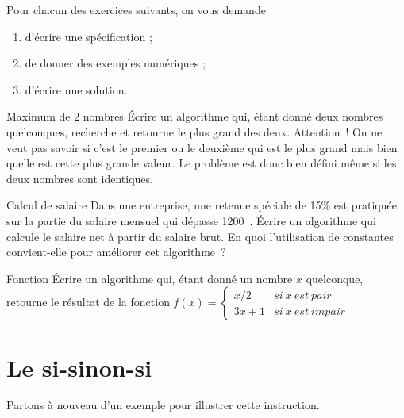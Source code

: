 		Pour chacun des exercices suivants,
		on vous demande
		\begin{enumerate}
		\item
			d'écrire une spécification ;
		\item
			de donner des exemples numériques ;
		\item
			d'écrire une solution.
		\end{enumerate}
		
		\begin{Exercice}{Maximum de 2 nombres}
			Écrire un algorithme qui, étant donné deux nombres quelconques,
			recherche et retourne le plus grand des deux. Attention~! On ne veut
			pas savoir si c’est le premier ou le deuxième qui est
			le plus grand mais bien quelle est cette plus grande valeur. Le
			problème est donc bien défini même si les deux nombres sont
			identiques.
		\end{Exercice}
		
		\begin{Exercice}{Calcul de salaire}
			Dans une entreprise, 
			une retenue spéciale de 15\% est pratiquée 
			sur la partie du salaire mensuel qui dépasse 1200~\texteuro. 
			Écrire un algorithme qui calcule le salaire net à partir du salaire brut. 
			En quoi l’utilisation de constantes convient-elle pour améliorer cet algorithme~?
		\end{Exercice}

		\begin{Exercice}{Fonction}
			Écrire un algorithme qui, étant donné un nombre $x$ quelconque,
			retourne le résultat de la fonction
			$f(x)=
				\left\{
				\begin{array}{rl}
					x/2 & si \ x \ est\ pair\\
					3x+1 & si \ x \ est \ impair
				\end{array}
				\right.$
		\end{Exercice}


\section{Le si-sinon-si}

	Partons à nouveau d'un exemple pour illustrer cette instruction.
	

